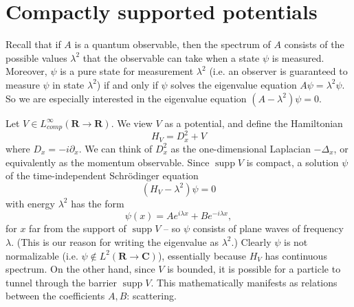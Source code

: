 \documentclass[12pt]{report}
\newcommand{\RR}{\mathbf{R}}
\newcommand{\CC}{\mathbf{C}}
\DeclareMathOperator{\supp}{supp}
\theoremstyle{definition}
\begin{document}
\chapter{Compactly supported potentials}


Recall that if $A$ is a quantum observable, then the spectrum of $A$ consists of the possible values $\lambda^2$ that the observable can take when a state $\psi$ is measured. Moreover, $\psi$ is a pure state for measurement $\lambda^2$ (i.e. an observer is guaranteed to measure $\psi$ in state $\lambda^2$) if and only if $\psi$ solves the eigenvalue equation $A\psi = \lambda^2 \psi$. So we are especially interested in the eigenvalue equation $(A - \lambda^2)\psi = 0$.

Let $V \in L^\infty_{comp}(\RR \to \RR)$. We view $V$ as a potential, and define the Hamiltonian
$$H_V = D_x^2 + V$$
where $D_x = -i\partial_x$. We can think of $D_x^2$ as the one-dimensional Laplacian $-\Delta_x$, or equivalently as the momentum observable. Since $\supp V$ is compact, a solution $\psi$ of the time-independent Schrödinger equation
$$(H_V - \lambda^2)\psi = 0$$
with energy $\lambda^2$ has the form
$$\psi(x) = Ae^{i\lambda x} + Be^{-i\lambda x},$$
for $x$ far from the support of $\supp V$ -- so $\psi$ consists of plane waves of frequency $\lambda$. (This is our reason for writing the eigenvalue as $\lambda^2$.) Clearly $\psi$ is not normalizable (i.e. $\psi \notin L^2(\RR \to \CC)$), essentially because $H_V$ has continuous spectrum. On the other hand, since $V$ is bounded, it is possible for a particle to tunnel through the barrier $\supp V$. This mathematically manifests as relations between the coefficients $A,B$: scattering.
\end{document}
